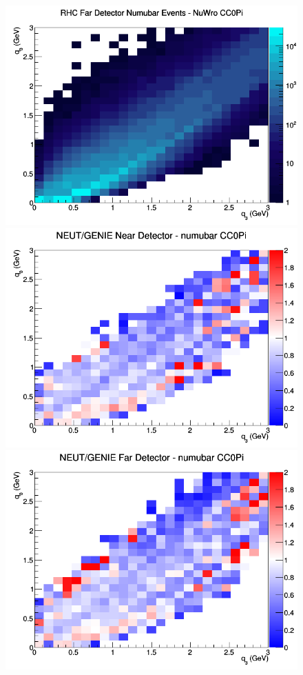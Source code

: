 \begin{figure}[h]
\endminipage
{}
\includegraphics[width=\linewidth]{eff_q0_q3/LAr/CC0Pi_RHC_FD_numubar_q3_q0_NuWro.png}
\endminipage
\newline
{}
\includegraphics[width=\linewidth]{eff_q0_q3/LAr/ratios/CC0Pi_NEUT_GENIE_numubar_near_q3_q0.png}
\endminipage
{}
\includegraphics[width=\linewidth]{eff_q0_q3/LAr/ratios/CC0Pi_NEUT_GENIE_numubar_far_q3_q0.png}

\end{figure}
